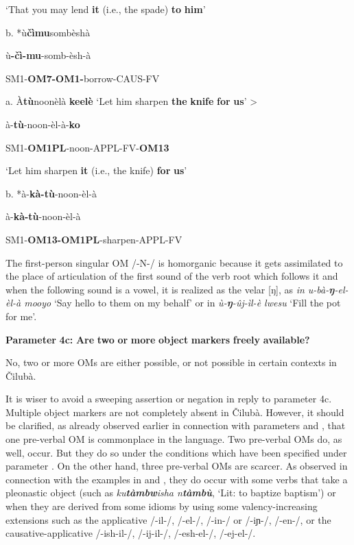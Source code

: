 \documentclass[output=paper]{langscibook}
\begin{document}
\glt ‘That you may lend \textbf{it} (i.e., the spade) \textbf{to} \textbf{him}’

{b.  *ù\textbf{čìmu}sombèshà}

{   ù\textbf{{}-}\textbf{čì-mu}{}-somb-èsh-à}

       SM1-\textbf{OM7-OM1-}borrow-CAUS-FV

\ea%
    \label{ex:lukusa:42}
    \z

           a.  À\textbf{tù}noonèlà \textbf{keelè}       ‘Let him sharpen \textbf{the} \textbf{knife} \textbf{for} \textbf{us}’  >

  à{}-\textbf{tù}{}-noon-èl-à-\textbf{ko}

SM1-\textbf{OM1PL}{}-noon-APPL-FV-\textbf{OM13}

\glt ‘Let him sharpen \textbf{it} (i.e., the knife) \textbf{for} \textbf{us}’

b.  *à-\textbf{kà-tù}{}-noon-èl-à

  à{}-\textbf{kà-tù}{}-noon-èl-à

  SM1-\textbf{OM13-OM1PL}{}-sharpen-APPL-FV

The first-person singular OM /-N-/ is homorganic because it gets assimilated to the place of articulation of the first sound of the verb root which follows it and when the following sound is a vowel, it is realized as the velar [ŋ], as \textit{in u-bà-}\textbf{\textit{ŋ}}\textit{{}-el-èl-à mooyo} ‘Say hello to them on my behalf’ or in {\textit{ù}}\textit{{}-}\textbf{\textit{ŋ}}\textit{{}-}{\textit{û}}\textit{j-}{\textit{ì}}\textit{l-è lwesu} ‘Fill the pot for me’.

\textbf{Parameter} \textbf{4c:} \textbf{Are} \textbf{two} \textbf{or} \textbf{more} \textbf{object} \textbf{markers} \textbf{freely} \textbf{available?}

No, two or more OMs are either possible, or not possible in certain contexts in Čilubà.

It is wiser to avoid a sweeping assertion or negation in reply to parameter 4c. Multiple object markers are not completely absent in Čilubà. However, it should be clarified, as already observed earlier in connection with parameters  and , that one pre-verbal OM is commonplace in the language. Two pre-verbal OMs do, as well, occur. But they do so under the conditions which have been specified under parameter . On the other hand, three pre-verbal OMs are scarcer. As observed in connection with the examples in  and , they do occur with some verbs that take a pleonastic object (such as \textit{ku}\textbf{\textit{tàmbw}}\textit{isha n}\textbf{\textit{tàmbù}}, ‘Lit: to baptize baptism’) or when they are derived from some idioms by using some valency-increasing extensions such as the applicative /-il-/, /-el-/, /-in-/ or /-iɲ-/, /-en-/, or the causative-applicative /-ish-il-/, /-ij-il-/, /-esh-el-/, /-ej-el-/.
\end{document}
